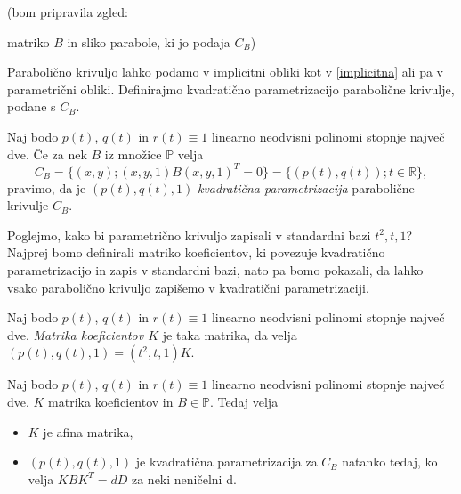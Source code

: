 \documentclass[mat1]{fmfdelo}
\newcommand{\R}{\mathbb R}
\newcommand{\PP}{\mathbb P}
\begin{document}
\begin{zgled}

(bom pripravila zgled: 

matriko $B$ in sliko parabole, ki jo podaja $C_B$)

\end{zgled}

Parabolično krivuljo lahko podamo v implicitni obliki kot v \eqref{implicitna} ali pa v parametrični obliki. Definirajmo kvadratično parametrizacijo parabolične krivulje, podane s $C_B$.

\begin{definicija}
Naj bodo $p(t)$, $q(t)$ in $r(t) \equiv 1$ linearno neodvisni polinomi stopnje največ dve. Če za nek $B$ iz množice $\PP$ velja 
$$ C_B = \{ (x,y); (x,y,1) B (x, y, 1)^T = 0 \} = \{ (p(t), q(t)); t \in \R \},$$
pravimo, da je $( p(t), q(t), 1)$ \emph{kvadratična parametrizacija} parabolične krivulje $C_B$.
\end{definicija}

Poglejmo, kako bi parametrično krivuljo zapisali v standardni bazi $t^2, t, 1$? Najprej bomo definirali matriko koeficientov, ki povezuje kvadratično parametrizacijo in zapis v standardni bazi, nato pa bomo pokazali, da lahko vsako parabolično krivuljo zapišemo v kvadratični parametrizaciji.

\begin{definicija}
Naj bodo $p(t)$, $q(t)$ in $r(t) \equiv 1$ linearno neodvisni polinomi stopnje največ dve. \emph{Matrika koeficientov $K$} je taka matrika, da velja $ (p(t), q(t), 1) = (t^2,t,1) K$.
\end{definicija} 

\begin{trditev}
Naj bodo $p(t)$, $q(t)$ in $r(t) \equiv 1$ linearno neodvisni polinomi stopnje največ dve, $K$ matrika koeficientov in $B \in \PP$. Tedaj velja
\begin{itemize}
\item $K$ je afina matrika,
\item  $ ( p(t), q(t), 1)$ je kvadratična parametrizacija za $C_B$ natanko tedaj, ko velja $K B K^T = d D$ za neki neničelni d.
\end{itemize}
\end{trditev}
\end{document}
